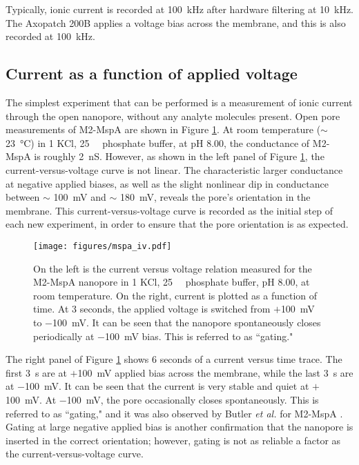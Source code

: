 Typically, ionic current is recorded at \SI{100}{\kHz} after hardware filtering at \SI{10}{\kHz}.  The Axopatch 200B applies a voltage bias across the membrane, and this is also recorded at \SI{100}{\kHz}.

\subsection{Current as a function of applied voltage}

The simplest experiment that can be performed is a measurement of ionic current through the open nanopore, without any analyte molecules present.  Open pore measurements of M2-MspA are shown in Figure \ref{fig:iv_mspa}.  At room temperature ($\sim$ \SI{23}{\degreeCelsius}) in \SI{1}{\Molar} KCl, \SI{25}{\milli\Molar} phosphate buffer, at pH \num{8.00}, the conductance of M2-MspA is roughly \SI{2}{\nano\siemens}.  However, as shown in the left panel of Figure \ref{fig:iv_mspa}, the current-versus-voltage curve is not linear.  The characteristic larger conductance at negative applied biases, as well as the slight nonlinear dip in conductance between $\sim$ \SI{100}{\mV} and $\sim$ \SI{180}{\mV}, reveals the pore's orientation in the membrane.  This current-versus-voltage curve is recorded as the initial step of each new experiment, in order to ensure that the pore orientation is as expected.

\begin{figure}[h]
\begin{centering}
\texttt{[image: figures/mspa\_iv.pdf]}
\caption[MspA current versus voltage]{On the left is the current versus voltage relation measured for the M2-MspA nanopore in \SI{1}{\Molar} KCl, \SI{25}{\milli\Molar} phosphate buffer, pH \num{8.00}, at room temperature.  On the right, current is plotted as a function of time.  At \num{3} seconds, the applied voltage is switched from $+$\SI{100}{\milli\volt} to \SI{-100}{\milli\volt}.  It can be seen that the nanopore spontaneously closes periodically at \SI{-100}{\milli\volt} bias.  This is referred to as ``gating."}
\label{fig:iv_mspa}
\end{centering}
\end{figure}

The right panel of Figure \ref{fig:iv_mspa} shows \num{6} seconds of a current versus time trace.  The first \SI{3}{\s} are at $+$\SI{100}{\mV} applied bias across the membrane, while the last \SI{3}{\s} are at $-$\SI{100}{\mV}.  It can be seen that the current is very stable and quiet at $+$\SI{100}{\mV}.  At $-$\SI{100}{\mV}, the pore occasionally closes spontaneously.  This is referred to as ``gating," and it was also observed by Butler \textit{et al.} for M2-MspA \citep{Butler2008}.  Gating at large negative applied bias is another confirmation that the nanopore is inserted in the correct orientation; however, gating is not as reliable a factor as the current-versus-voltage curve.


